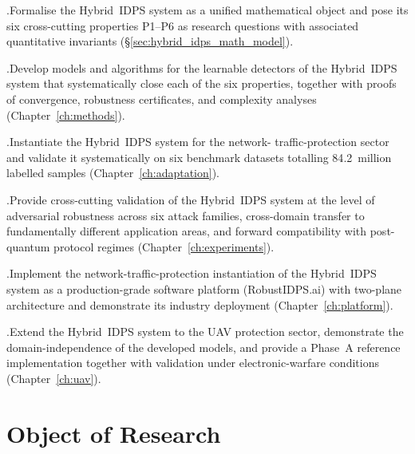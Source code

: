 .\quad Formalise the Hybrid~IDPS system as a unified
mathematical object and pose its six cross-cutting properties P1--P6
as research questions with associated quantitative invariants
(\S\ref{sec:hybrid_idps_math_model}).

.\quad Develop models and algorithms for the learnable
detectors of the Hybrid~IDPS system that systematically close each
of the six properties, together with proofs of convergence,
robustness certificates, and complexity analyses
(Chapter~\ref{ch:methods}).

.\quad Instantiate the Hybrid~IDPS system for the network-
traffic-protection sector and validate it systematically on six
benchmark datasets totalling 84{.}2~million labelled samples
(Chapter~\ref{ch:adaptation}).

.\quad Provide cross-cutting validation of the
Hybrid~IDPS system at the level of adversarial robustness across
six attack families, cross-domain transfer to fundamentally
different application areas, and forward compatibility with
post-quantum protocol regimes (Chapter~\ref{ch:experiments}).

.\quad Implement the network-traffic-protection
instantiation of the Hybrid~IDPS system as a production-grade
software platform (\textsf{RobustIDPS.ai}) with two-plane
architecture and demonstrate its industry deployment
(Chapter~\ref{ch:platform}).

.\quad Extend the Hybrid~IDPS system to the UAV
protection sector, demonstrate the domain-independence of the
developed models, and provide a Phase~A reference implementation
together with validation under electronic-warfare conditions
(Chapter~\ref{ch:uav}).

\section*{Object of Research}

